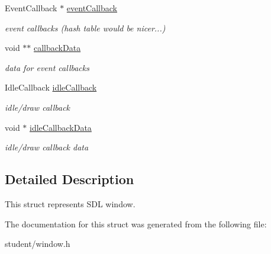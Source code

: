 \begin{DoxyCompactItemize}
\mbox{\label{structWindow_a054598f068dfafd211d76b092b3de669}} 
Event\+Callback $\ast$ \hyperlink{structWindow_a054598f068dfafd211d76b092b3de669}{event\+Callback}
\begin{DoxyCompactList}\small\item\em event callbacks (hash table would be nicer...) \end{DoxyCompactList}\item 
\mbox{\label{structWindow_a149e9e3b4ca65e5feb3a492b3a3eaca1}} 
void $\ast$$\ast$ \hyperlink{structWindow_a149e9e3b4ca65e5feb3a492b3a3eaca1}{callback\+Data}
\begin{DoxyCompactList}\small\item\em data for event callbacks \end{DoxyCompactList}\item 
\mbox{\label{structWindow_aca8fcf0113fd079f5bc4050c1f72a93b}} 
Idle\+Callback \hyperlink{structWindow_aca8fcf0113fd079f5bc4050c1f72a93b}{idle\+Callback}
\begin{DoxyCompactList}\small\item\em idle/draw callback \end{DoxyCompactList}\item 
\mbox{\label{structWindow_a91eae2aff16e63ff29644aa0d287abb1}} 
void $\ast$ \hyperlink{structWindow_a91eae2aff16e63ff29644aa0d287abb1}{idle\+Callback\+Data}
\begin{DoxyCompactList}\small\item\em idle/draw callback data \end{DoxyCompactList}\end{DoxyCompactItemize}


\subsection{Detailed Description}
This struct represents S\+DL window. 

The documentation for this struct was generated from the following file\+:\begin{DoxyCompactItemize}
\item 
student/window.\+h\end{DoxyCompactItemize}
